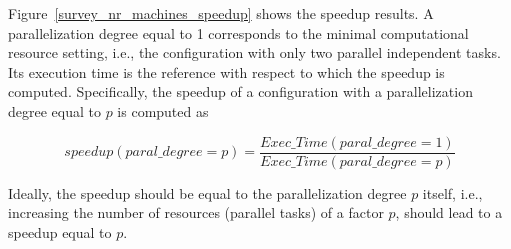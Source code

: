 Figure~\ref{survey_nr_machines_speedup} shows the speedup results. 
A parallelization degree equal to 1 corresponds to the minimal computational resource setting, i.e., the configuration with only two parallel independent tasks.
Its execution time is the reference with respect to which the speedup is computed. 
Specifically, the speedup of a configuration with a parallelization degree equal to $p$ is computed as 

$$speedup(paral\_degree=p)=\frac{Exec\_Time(paral\_degree=1)}{Exec\_Time(paral\_degree=p)}$$ 

Ideally, the speedup should be equal to the parallelization degree $p$ itself, i.e., 
increasing the number of resources (parallel tasks) of a factor $p$, should lead to a speedup equal to $p$.

